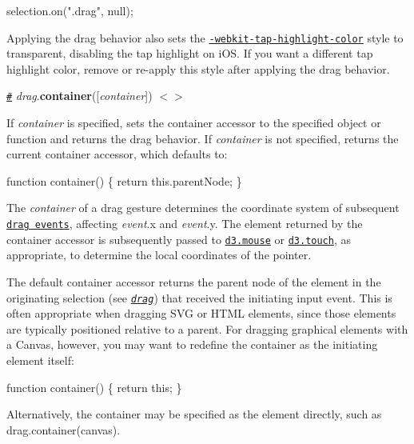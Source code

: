 \begin{DoxyCode}
selection.on(".drag", null);
\end{DoxyCode}


Applying the drag behavior also sets the \href{https://developer.apple.com/library/mac/documentation/AppleApplications/Reference/SafariWebContent/AdjustingtheTextSize/AdjustingtheTextSize.html#//apple_ref/doc/uid/TP40006510-SW5}{\tt -\/webkit-\/tap-\/highlight-\/color} style to transparent, disabling the tap highlight on i\+OS. If you want a different tap highlight color, remove or re-\/apply this style after applying the drag behavior.

\href{#drag_container}{\tt \#} {\itshape drag}.{\bfseries container}(\mbox{[}{\itshape container}\mbox{]}) \href{https://github.com/d3/d3-drag/blob/master/src/drag.js#L145}{\tt $<$$>$}

If {\itshape container} is specified, sets the container accessor to the specified object or function and returns the drag behavior. If {\itshape container} is not specified, returns the current container accessor, which defaults to\+:


\begin{DoxyCode}
function container() \{
  return this.parentNode;
\}
\end{DoxyCode}


The {\itshape container} of a drag gesture determines the coordinate system of subsequent \href{#drag-events}{\tt drag events}, affecting {\itshape event}.x and {\itshape event}.y. The element returned by the container accessor is subsequently passed to \href{https://github.com/d3/d3-selection#mouse}{\tt d3.\+mouse} or \href{https://github.com/d3/d3-selection#touch}{\tt d3.\+touch}, as appropriate, to determine the local coordinates of the pointer.

The default container accessor returns the parent node of the element in the originating selection (see \href{#_drag}{\tt {\itshape drag}}) that received the initiating input event. This is often appropriate when dragging S\+VG or H\+T\+ML elements, since those elements are typically positioned relative to a parent. For dragging graphical elements with a Canvas, however, you may want to redefine the container as the initiating element itself\+:


\begin{DoxyCode}
function container() \{
  return this;
\}
\end{DoxyCode}


Alternatively, the container may be specified as the element directly, such as {\ttfamily drag.\+container(canvas)}.

